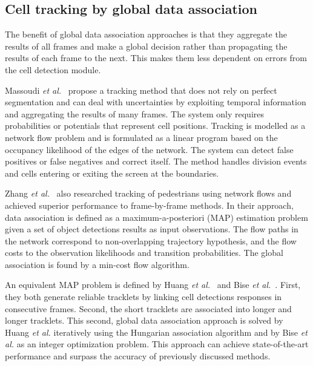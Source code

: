 \subsection{Cell tracking by global data association \statusfirstdraft}

The benefit of global data association approaches is that they aggregate the results of all frames and make a global decision rather than propagating the results of each frame to the next. This makes them less dependent on errors from the cell detection module.

Massoudi \emph{et al.}~\cite{massoudi12} propose a tracking method that does not rely on perfect segmentation and can deal with uncertainties by exploiting temporal information and aggregating the results of many frames. The system only requires probabilities or potentials that represent cell positions. Tracking is modelled as a network flow problem and is formulated as a linear program based on the occupancy likelihood of the edges of the network. The system can detect false positives or false negatives and correct itself. The method handles division events and cells entering or exiting the screen at the boundaries.

Zhang \emph{et al.}~\cite{zhang08} also researched tracking of pedestrians using network flows and achieved superior performance to frame-by-frame methods. In their approach, data association is defined as a maximum-a-posteriori (MAP) estimation problem given a set of object detections results as input observations. The flow paths in the network correspond to non-overlapping trajectory hypothesis, and the flow costs to the observation likelihoods and transition probabilities. The global association is found by a min-cost flow algorithm.

An equivalent MAP problem is defined by Huang \emph{et al.}~\cite{huang08} and Bise \emph{et al.}~\cite{bise11global}. First, they both generate reliable tracklets by linking cell detections responses in consecutive frames. Second, the short tracklets are associated into longer and longer tracklets. This second, global data association approach is solved by Huang \emph{et al.} iteratively using the Hungarian association algorithm \cite{kuhn55} and by Bise \emph{et al.} as an integer optimization problem. This approach can achieve state-of-the-art performance and surpass the accuracy of previously discussed methods.

